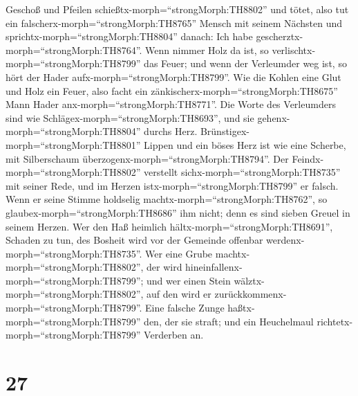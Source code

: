 Geschoß und Pfeilen schießtx-morph=``strongMorph:TH8802'' und tötet,
 also tut ein falscherx-morph=``strongMorph:TH8765'' Mensch
mit seinem Nächsten und sprichtx-morph=``strongMorph:TH8804'' danach:
Ich habe gescherztx-morph=``strongMorph:TH8764''.  Wenn
nimmer Holz da ist, so verlischtx-morph=``strongMorph:TH8799'' das
Feuer; und wenn der Verleumder weg ist, so hört der Hader
aufx-morph=``strongMorph:TH8799''.  Wie die Kohlen eine
Glut und Holz ein Feuer, also facht ein
zänkischerx-morph=``strongMorph:TH8675'' Mann Hader
anx-morph=``strongMorph:TH8771''.  Die Worte des
Verleumders sind wie Schlägex-morph=``strongMorph:TH8693'', und sie
gehenx-morph=``strongMorph:TH8804'' durchs Herz. 
Brünstigex-morph=``strongMorph:TH8801'' Lippen und ein böses Herz ist
wie eine Scherbe, mit Silberschaum
überzogenx-morph=``strongMorph:TH8794''.  Der
Feindx-morph=``strongMorph:TH8802'' verstellt
sichx-morph=``strongMorph:TH8735'' mit seiner Rede, und im Herzen
istx-morph=``strongMorph:TH8799'' er falsch.  Wenn er seine
Stimme holdselig machtx-morph=``strongMorph:TH8762'', so
glaubex-morph=``strongMorph:TH8686'' ihm nicht; denn es sind sieben
Greuel in seinem Herzen.  Wer den Haß heimlich
hältx-morph=``strongMorph:TH8691'', Schaden zu tun, des Bosheit wird vor
der Gemeinde offenbar werdenx-morph=``strongMorph:TH8735''.
 Wer eine Grube machtx-morph=``strongMorph:TH8802'', der
wird hineinfallenx-morph=``strongMorph:TH8799''; und wer einen Stein
wälztx-morph=``strongMorph:TH8802'', auf den wird er
zurückkommenx-morph=``strongMorph:TH8799''.  Eine falsche
Zunge haßtx-morph=``strongMorph:TH8799'' den, der sie straft; und ein
Heuchelmaul richtetx-morph=``strongMorph:TH8799'' Verderben an.

\hypertarget{section-26}{%
\section{27}\label{section-26}}

